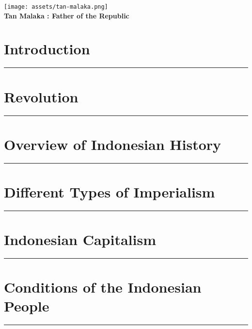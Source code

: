 \documentclass[12pt, oneside, a4paper]{memoir}
\begin{document}
    
    \newpage

    \begin{center}
        \thispagestyle{empty}
        \texttt{[image: assets/tan-malaka.png]}\\
        \textbf{Tan Malaka : Father of the Republic}
        \newpage
    \end{center}

    \tableofcontents
    \newpage

    \chapter{\centering Introduction}
    \hrule
    \vspace*{1cm}
    
    \newpage

    \chapter{\centering Revolution}
    \hrule
    \vspace*{1cm}
    

    \chapter{\centering Overview of Indonesian History}
    \hrule
    \vspace*{1cm}
    

    \chapter{\centering Different Types of Imperialism}
    \hrule
    \vspace*{1cm}
    

    \chapter{\centering Indonesian Capitalism}
    \hrule
    \vspace*{1cm}
    

    \chapter{\centering Conditions of the Indonesian People}
    \hrule
    \vspace*{1cm}
    
\end{document}
